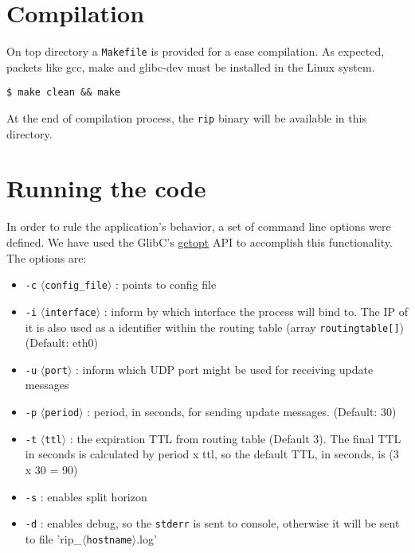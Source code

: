 \documentclass[10pt]{extarticle}
\newcommand{\abracket}[1]{$\langle$\texttt{#1}$\rangle$}
\begin{document}
\section{Compilation}

On top directory a \texttt{Makefile} is provided for a ease compilation. As
expected, packets like gcc, make and glibc-dev must be installed in the Linux
system.

\begin{Verbatim}
$ make clean && make
\end{Verbatim}

At the end of compilation process, the \texttt{rip} binary will be available in
this directory.

\section{Running the code}

In order to rule the application's behavior,  a set of command line options were
defined.          We           have          used           the          GlibC's
\href{http://www.gnu.org/software/libc/manual/html_node/Getopt.html}{getopt} API
to accomplish this functionality. The options are:

\begin{itemize}
\item{\texttt{-c}} \abracket{config\_file} : points to config file
\item{\texttt{-i}} \abracket{interface} : inform  by which interface the process
will bind to. The IP of it is also used as a identifier within the routing table
(array \texttt{routingtable[]}) (Default: eth0)
\item{\texttt{-u}} \abracket{port}  : inform  which UDP port  might be  used for
receiving update messages
\item{\texttt{-p}} \abracket{period}  : period,  in seconds, for  sending update
messages. (Default: 30)
\item{\texttt{-t}}  \abracket{ttl}  :  the  expiration TTL  from  routing  table
(Default 3).  The final TTL  in seconds  is calculated by  period x ttl,  so the
default TTL, in seconds, is (3 x 30 = 90)
\item{\texttt{-s}} : enables split horizon
\item{\texttt{-d}} : enables  debug, so the \texttt{stderr} is  sent to console,
otherwise it will be sent to file 'rip\_\abracket{hostname}.log'
\end{itemize}
\end{document}

